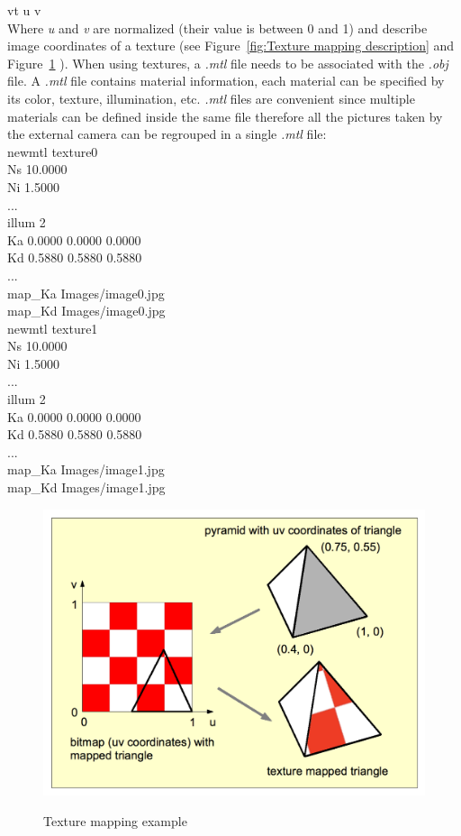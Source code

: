 \noindent vt u v\\

Where \textit{u} and \textit{v} are normalized (their value is between 0 and 1) and describe image coordinates of a texture (see Figure~\ref{fig:Texture mapping description} and Figure~\ref{fig:Texture mapping example} \cite{blogtartiflop}). When using textures, a \textit{.mtl} file needs to be associated with the \textit{.obj} file. A \textit{.mtl} file contains material information, each material can be specified by its color, texture, illumination, etc. \textit{.mtl} files are convenient since multiple materials can be defined inside the same file therefore all the pictures taken by the external camera can be regrouped in a single \textit{.mtl} file:\\

\noindent newmtl texture0\\
  Ns 10.0000\\
  Ni 1.5000\\
  ...\\
  illum 2\\
  Ka 0.0000 0.0000 0.0000\\
  Kd 0.5880 0.5880 0.5880\\
  ...\\
  map\_Ka Images/image0.jpg\\
  map\_Kd Images/image0.jpg\\

\noindent newmtl texture1\\
  Ns 10.0000\\
  Ni 1.5000\\
  ...\\
  illum 2\\
  Ka 0.0000 0.0000 0.0000\\
  Kd 0.5880 0.5880 0.5880\\
  ...\\
  map\_Ka Images/image1.jpg\\
  map\_Kd Images/image1.jpg \\ 

\begin{figure}
\caption{Texture mapping example}
\centering
    \includegraphics[width=1.0\textwidth]{images/textureMappingExample.png}
\label{fig:Texture mapping example}
\end{figure}


